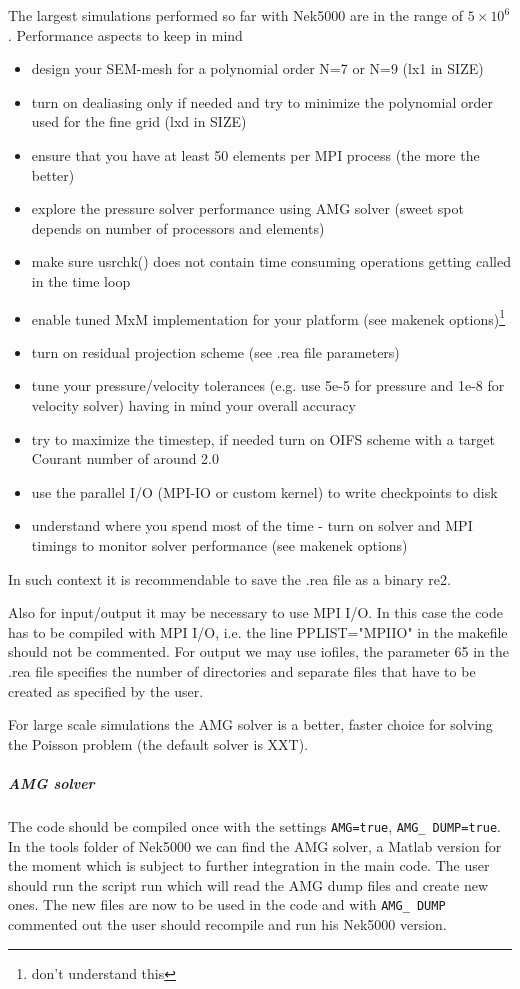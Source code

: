 The largest simulations performed so far with Nek5000 are in the range of $5\times 10^6$. 
Performance aspects to keep in mind
\begin{itemize}
\item design your SEM-mesh for a polynomial order N=7 or N=9 (lx1 in SIZE)
\item turn on dealiasing only if needed and try to minimize the polynomial order used for the fine grid (lxd in SIZE)
\item ensure that you have at least 50 elements per MPI process (the more the better)
\item explore the pressure solver performance using AMG solver (sweet spot depends on number of processors and elements)
\item make sure usrchk() does not contain time consuming operations getting called in the time loop
\item enable tuned MxM implementation for your platform (see makenek options)\footnote{don't understand this}
\item turn on residual projection scheme (see .rea file parameters)
\item tune your pressure/velocity tolerances (e.g. use 5e-5 for pressure and 1e-8 for velocity solver) having in mind your overall accuracy
\item try to maximize the timestep, if needed turn on OIFS scheme with a target Courant number of around 2.0
\item use the parallel I/O (MPI-IO or custom kernel) to write checkpoints to disk
\item understand where you spend most of the time - turn on solver and MPI timings to monitor solver performance (see makenek options)
\end{itemize}



In such context it is recommendable to save the .rea file as a binary re2. 

Also for input/output it may be necessary to use MPI I/O. In this case the code has to be compiled with MPI I/O, i.e. the line PPLIST="MPIIO" in the makefile should not be commented. For output we may use iofiles, the parameter 65 in the .rea file specifies the number of directories and separate files that have to be created as specified by the user.

For large scale simulations the AMG solver is a better, faster choice for solving the Poisson problem (the default solver is XXT).

\subparagraph*{AMG solver}
The code should be compiled once with the settings \texttt{AMG=true}, \texttt{AMG\_ DUMP=true}. In the tools folder of Nek5000 we can find the AMG solver, a Matlab version for the moment which is subject to further integration in the main code. The user should run the script run which will read the AMG dump files and create new ones. The new files are now to be used in the code and with \texttt{AMG\_ DUMP} commented out the user should recompile and run his Nek5000 version.

